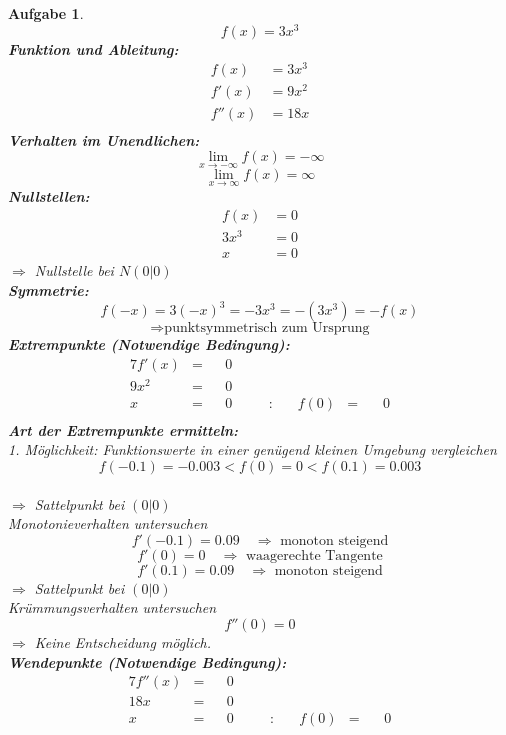 \documentclass[12pt]{article}
\theoremstyle{note}
\newtheorem{aufgabe}{Aufgabe}
\begin{document}
\begin{flushleft}
\begin{aufgabe} ~  
$$f(x)=3 x^{3}$$ 
{\bf Funktion und Ableitung:} 
\begin{align*} 
f(x)&=3 x^{3}\\ 
f'(x)&=9 x^{2}\\ 
f''(x)&=18 x\\ 
\end{align*} 
{\bf Verhalten im Unendlichen:} 
\[ \lim_{x\rightarrow -\infty} f(x) =-\infty\]\[ \lim_{x\rightarrow\infty} f(x) =\infty\]{\bf Nullstellen:} 
\begin{align*} 
f(x)&=0 \\ 
3 x^{3}&=0 \\ 
x&=0\end{align*} 
$\Rightarrow$ Nullstelle bei $N(0|0)$ \\ 
{\bf Symmetrie:} 
\[ f(-x)=3 (-x)^{3}=- 3 x^{3}=-(3 x^{3})=-f(x) \]\[ \Rightarrow \text{punktsymmetrisch zum Ursprung} \]{\bf Extrempunkte (Notwendige Bedingung):} 
\begin{alignat*}{7} 
f'(x)&=& &0& \\ 
9 x^{2}&=& &0& \\ 
x&=& &0& \quad &:& \quad f(0)&=& \, &0\\ 
\end{alignat*} 
{\bf Art der Extrempunkte ermitteln:} \\[1em] 
{\em 1. M\"oglichkeit:} Funktionswerte in einer gen\"ugend kleinen Umgebung vergleichen \\ 
$$f(-0.1)=-0.003  <  f(0)=0  <   f(0.1)=0.003$$\\ 
$\Rightarrow$ Sattelpunkt bei $(0|0)$ \\ 
\vspace{1em}{\em 2. M\"oglichkeit:} Monotonieverhalten untersuchen \\ 
$$f'(-0.1)=0.09\quad \Rightarrow \text{ monoton steigend} $$$$f'(0)=0 \quad \Rightarrow \text{ waagerechte Tangente} $$$$f'(0.1)=0.09\quad \Rightarrow \text{ monoton steigend} $$$\Rightarrow$ Sattelpunkt bei $(0|0)$ \\ 
\vspace{1em}{\em 3. M\"oglichkeit:} Kr\"ummungsverhalten untersuchen \\ 
$$f''(0)=0$$ 
$\Rightarrow$ Keine Entscheidung m\"oglich. \\ 
{\bf Wendepunkte (Notwendige Bedingung):} 
\begin{alignat*}{7} 
f''(x)&=& &0& \\ 
18 x&=& &0& \\ 
x&=& &0& \quad &:& \quad f(0)&=& \, &0\\ 
\end{alignat*} 


\end{aufgabe}
\end{flushleft}
\end{document}

